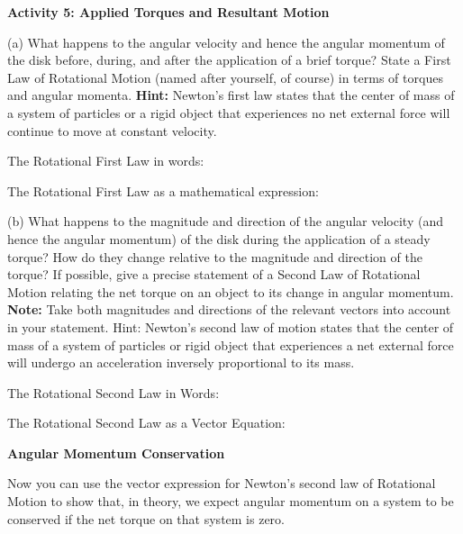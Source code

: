 \textbf{Activity 5: Applied Torques and Resultant Motion }

(a) What happens to the angular velocity and hence the angular momentum of the
disk before, during, and after the application of a brief torque? State a First
Law of Rotational Motion (named after yourself, of course) in terms of torques
and angular momenta. \textbf{Hint:} Newton's first law states that the center
of mass
of a system of particles or a rigid object that experiences no net external
force will continue to move at constant velocity.

The Rotational First Law in words:
\vspace{20mm}

The Rotational First Law as a mathematical expression: 
\vspace{10mm}

(b) What happens to the magnitude and direction of the angular velocity (and
hence the angular momentum) of the disk during the application of a steady torque?
How do they change relative to the magnitude and direction of the torque? If
possible, give a precise statement of a Second Law of Rotational Motion relating
the net torque on an object to its change in angular momentum. \textbf{Note:}
Take both magnitudes and directions of the relevant vectors into account in
your statement. Hint: Newton's second law of motion states that the center of mass
of a system of particles or rigid object that experiences a net external force
will undergo an acceleration inversely proportional to its mass.
\vspace{20mm}

The Rotational Second Law in Words:
\vspace{20mm}

The Rotational Second Law as a Vector Equation:
\vspace{20mm}

\newpage

\textbf{Angular Momentum Conservation }

Now you can use the vector expression for Newton's second law of Rotational
Motion to show that, in theory, we expect angular momentum on a system to be
conserved if the net torque on that system is zero.

